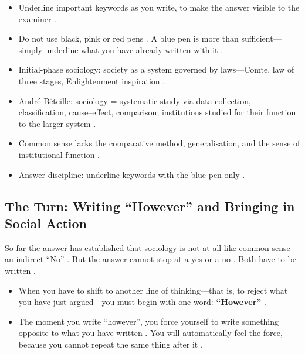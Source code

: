 \begin{CriticalPoint}
\begin{itemize}
    \item Underline important keywords as you write, to make the answer visible to the examiner .
    \item Do not use black, pink or red pens . A blue pen is more than sufficient---simply underline what you have already written with it .
\end{itemize}
\end{CriticalPoint}

\begin{QuickRevision}
\begin{itemize}
    \item Initial-phase sociology: society as a system governed by laws---Comte, law of three stages, Enlightenment inspiration .
    \item André Béteille: sociology = systematic study via data collection, classification, cause--effect, comparison; institutions studied for their function to the larger system .
    \item Common sense lacks the comparative method, generalisation, and the sense of institutional function .
    \item Answer discipline: underline keywords with the blue pen only .
\end{itemize}
\end{QuickRevision}

\subsection{The Turn: Writing ``However'' and Bringing in Social Action}
So far the answer has established that sociology is not at all like common sense---an indirect ``No'' . But the answer cannot stop at a yes or a no . Both have to be written .

\begin{KeyConcept}
\begin{itemize}
    \item When you have to shift to another line of thinking---that is, to reject what you have just argued---you must begin with one word: \textbf{``However''} .
    \item The moment you write ``however'', you force yourself to write something opposite to what you have written . You will automatically feel the force, because you cannot repeat the same thing after it .
\end{itemize}
\end{KeyConcept}

